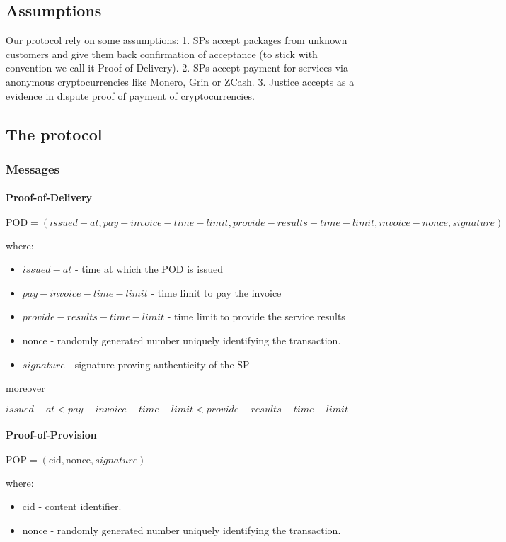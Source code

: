 \documentclass{article}
\begin{document}
\subsection{Assumptions}
Our protocol rely on some assumptions:
1. SPs accept packages from unknown customers and give them back confirmation of acceptance (to stick with convention we call it Proof-of-Delivery).
2. SPs accept payment for services via anonymous cryptocurrencies like Monero, Grin or ZCash. 
3. Justice accepts as a evidence in dispute proof of payment of cryptocurrencies. 

\subsection{The protocol}
\subsubsection{Messages}
\paragraph{Proof-of-Delivery}

$\mathrm{POD} = (issued-at, pay-invoice-time-limit, provide-results-time-limit, invoice-nonce, signature)$

where:
\begin{itemize}
    \item $issued-at$ - time at which the POD is issued
    \item $pay-invoice-time-limit$ - time limit to pay the invoice 
    \item $provide-results-time-limit$ - time limit to provide the service results
    \item $\mathrm{nonce}$ - randomly generated number uniquely identifying the transaction.
    \item $signature$ - signature proving authenticity of the SP
\end{itemize}
moreover

$issued-at < pay-invoice-time-limit < provide-results-time-limit$

\paragraph{Proof-of-Provision}
$\mathrm{POP} = (\mathrm{cid}, \mathrm{nonce}, signature)$

where:
\begin{itemize}
    \item $\mathrm{cid}$ - content identifier.
    \item $\mathrm{nonce}$ - randomly generated number uniquely identifying the transaction.
\end{itemize}
\end{document}

